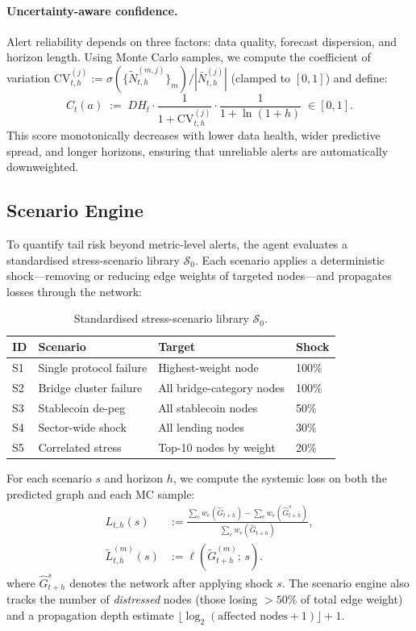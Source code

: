 \paragraph{Uncertainty-aware confidence.}
Alert reliability depends on three factors: data quality, forecast dispersion, and horizon length. Using Monte Carlo samples, we compute the coefficient of variation $\mathrm{CV}_{t,h}^{(j)} := \sigma(\{\widetilde{N}^{(m,j)}_{t,h}\}_m) / |\bar{N}^{(j)}_{t,h}|$ (clamped to $[0,1]$) and define:
\begin{equation}
\label{eq:alert_confidence}
C_t(a)\;:=\; DH_t \cdot \frac{1}{1+\mathrm{CV}_{t,h}^{(j)}} \cdot \frac{1}{1+\ln(1+h)}\;\in[0,1].
\end{equation}
This score monotonically decreases with lower data health, wider predictive spread, and longer horizons, ensuring that unreliable alerts are automatically downweighted.

\subsection{Scenario Engine}
\label{subsec:scenario_engine}
To quantify tail risk beyond metric-level alerts, the agent evaluates a standardised stress-scenario library $\mathcal{S}_0$. Each scenario applies a deterministic shock---removing or reducing edge weights of targeted nodes---and propagates losses through the network:

\begin{table}[!t]
\centering
\footnotesize
\setlength{\tabcolsep}{4pt}
\begin{tabular}{llll}
\toprule
ID & Scenario & Target & Shock \\
\midrule
S1 & Single protocol failure & Highest-weight node & 100\% \\
S2 & Bridge cluster failure & All bridge-category nodes & 100\% \\
S3 & Stablecoin de-peg & All stablecoin nodes & 50\% \\
S4 & Sector-wide shock & All lending nodes & 30\% \\
S5 & Correlated stress & Top-10 nodes by weight & 20\% \\
\bottomrule
\end{tabular}
\caption{Standardised stress-scenario library $\mathcal{S}_0$.}
\label{tab:scenarios}
\end{table}

\noindent For each scenario $s$ and horizon $h$, we compute the systemic loss on both the predicted graph and each MC sample:
\begin{align}
\label{eq:scenario_loss}
L_{t,h}(s)
&:= \frac{\sum_e w_e(\widehat{G}_{t+h}) - \sum_e w_e(\widehat{G}_{t+h}^s)}
{\sum_e w_e(\widehat{G}_{t+h})},
\\
\widetilde{L}^{(m)}_{t,h}(s)
&:= \ell\!\left(\widetilde{G}^{(m)}_{t+h};\, s\right).
\end{align}
where $\widehat{G}_{t+h}^s$ denotes the network after applying shock $s$. The scenario engine also tracks the number of \emph{distressed} nodes (those losing $>50\%$ of total edge weight) and a propagation depth estimate $\lfloor\log_2(\text{affected nodes}+1)\rfloor + 1$.

